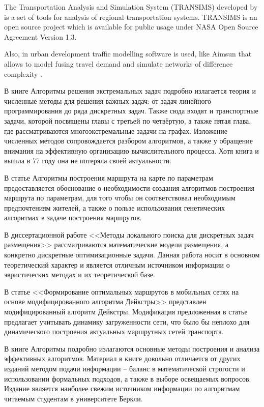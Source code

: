 The Transportation Analysis and Simulation System (TRANSIMS) developed by \cite{transims} is a set of 
tools for analysis of regional transportation systems. TRANSIMS is an open source project which is 
available for public usage under NASA Open Source Agreement Version 1.3.
 
Also, in urban development traffic modelling software is used, like Aimsun that allows to model fusing 
travel demand and simulate networks of difference complexity \cite{aimsun}.

В книге Алгоритмы решения экстремальных задач\cite{bib:56} подробно излагается теория и численные методы 
для решения важных задач: от задач линейного программирования до ряда дискретных задач. Также сюда входят 
и транспортные задачи, которой посвящены главы с третьей по четвёртую, а также пятая глава, где 
рассматриваются многоэкстремальные задачи на графах. Изложение численных методов сопровождается разбором 
алгоритмов, а также у обращение внимания на эффективную организацию вычислительного процесса. Хотя книга 
и вышла в 77 году она не потеряла своей актуальности.

В статье Алгоритмы построения маршрута на карте по параметрам\cite{bib:46} предоставляется обоснование 
о необходимости создания алгоритмов построения маршрута по параметрам, для того чтобы он соответствовал 
необходимым предпочтениям жителей, а также о пользе использования генетических алгоритмах в задаче 
построения маршрутов.

В диссертационной работе <<Методы локального поиска для дискретных задач размещения>>\cite{bib:45} 
рассматриваются математические модели размещения, а конкретно дискретные оптимизационные задачи. Данная 
работа носит в основном теоретический характер и является отличным источником информации о эвристических 
методах и их теоретической базе.

В статье <<Формирование оптимальных маршрутов в мобильных сетях на основе модифицированного алгоритма 
Дейкстры>>\cite{bib:55} представлен модифицированный алгоритм Дейкстры. Модификация предложенная в статье 
предлагает учитывать динамику загруженности сети, что было бы неплохо для динамического построения 
актуальных маршрутных сетей транспорта.

В книге Алгоритмы\cite{bib:47} подробно излагаются основные методы построения и анализа эффективных 
алгоритмов. Материал в книге довольно отличается от других изданий методом подачи информации -- баланс в 
математической строгости и использовании формальных подходов, а также в выборе освещаемых вопросов. 
Издание является наиболее свежим источником информации по алгоритмам читаемым студентам в университете Беркли.

